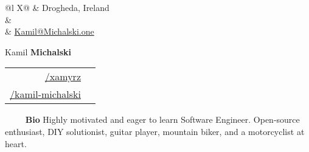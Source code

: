 \documentclass[a4paper, 11pt]{article}
\newcommand{\sectitle}[2]{\large{#1} \ \ \Large{\textbf{#2}}}
\begin{document}
	\pagestyle{fancy}

	\begin{center}
	\begin{multicols}{3}
		\begin{tabularx}{\linewidth}{@{}l X@{}}
			\faMapMarker & Drogheda, Ireland \\
			\IfFileExists{confidential.tex}{\faPhone & \href{tel:\phoneNumber}{\prettyPhoneNumber} \\}{}
			\faEnvelope	 & \href{mailto:Kamil@Michalski.one}{Kamil@Michalski.one} \\
		\end{tabularx} \vfill \null

		\columnbreak
			{ \Huge{Kamil \textbf{Michalski}}}
		\columnbreak

		\begin{tabularx}{\linewidth}{R | r}
				\href{https://github.com/xamyrz}{/xamyrz} & \faGithub \\
				\href{https://www.linkedin.com/in/kamil-michalski-7069451ab/}{/kamil-michalski} & \faLinkedin \\
		\end{tabularx} \vfill \null
	\end{multicols}
	\end{center}

	\vspace{-3.5mm}
	\begin{section}{\sectitle{\ \faUser}{\ Bio}}
		Highly motivated and eager to learn Software Engineer. Open-source enthusiast,  DIY solutionist, guitar player, mountain biker, and a motorcyclist at heart.  \\
	\end{section}
	\vspace{-3.5mm}


	
\newcommand{\education}[9]{
    \textsc{#1} & \textbf{#3:} #4 & \ifx&#5& #6 \else \href{#5}{#6} \fi \\[-1ex]
    \textsc{#2} & \footnotesize{\textbf{#7} #8} \\[-0.8ex]
    & \multicolumn{2}{p{0.9\textwidth}}{\footnotesize{#9}} \\[0ex]
}
\end{document}
